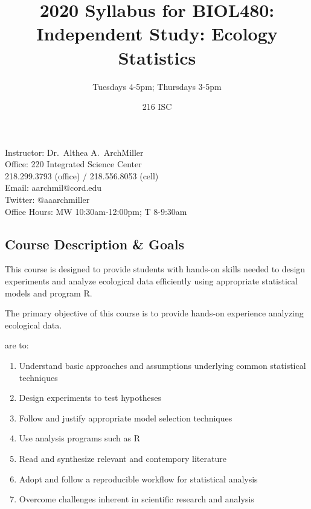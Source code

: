 \documentclass{tufte-handout}
\title{2020 Syllabus for BIOL480: Independent Study: Ecology Statistics}										%
\author{Tuesdays 4-5pm; Thursdays 3-5pm}										%
\date{216 ISC}
\begin{document}
\maketitle

Instructor: Dr.~Althea A.~ArchMiller\\
Office: 220 Integrated Science Center\\
218.299.3793 (office) / 218.556.8053 (cell)\\
Email: aarchmil@cord.edu\\
Twitter: @aaarchmiller\\
Office Hours: MW 10:30am-12:00pm; T 8-9:30am


\begin{fullwidth}

\section{Course Description \& Goals}

This course is designed to provide students with hands-on skills needed to design experiments and analyze ecological data efficiently using appropriate statistical models and program R. 


The primary objective of this course is to provide hands-on experience analyzing ecological data. 

 are to:

\begin{enumerate}
	\item Understand basic approaches and assumptions underlying common statistical techniques
	\item Design experiments to test hypotheses
	\item Follow and justify appropriate model selection techniques
	\item Use analysis programs such as R
	\item Read and synthesize relevant and contempory literature
	\item Adopt and follow a reproducible workflow for statistical analysis
	\item Overcome challenges inherent in scientific research and analysis
\end{enumerate}


\end{fullwidth}
\end{document}
